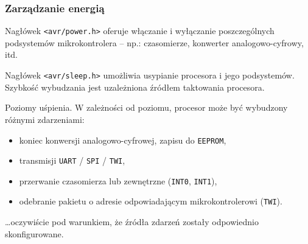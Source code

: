 \documentclass[8pt]{beamer}
\begin{document}
\begin{frame}
  \frametitle{Zarządzanie energią}

  \begin{block}{}
    Nagłówek \texttt{<avr/power.h>} oferuje włączanie i wyłączanie
    poszczególnych podsystemów mikrokontrolera -- np.: czasomierze, konwerter
    analogowo-cyfrowy, itd.
  \end{block}

  \begin{block}{}
    Nagłówek \texttt{<avr/sleep.h>} umożliwia usypianie procesora i jego
    podsystemów. Szybkość wybudzania jest uzależniona źródłem taktowania
    procesora.
  \end{block}

  \begin{exampleblock}{Poziomy uśpienia.}
    W zależności od poziomu, procesor może być wybudzony różnymi zdarzeniami:

    \begin{itemize}
      \item koniec konwersji analogowo-cyfrowej, zapisu do \texttt{EEPROM},
      \item transmisji \texttt{UART} / \texttt{SPI} / \texttt{TWI},
      \item przerwanie czasomierza lub zewnętrzne (\texttt{INT0}, \texttt{INT1}),
      \item odebranie pakietu o adresie odpowiadającym mikrokontrolerowi (\texttt{TWI}).
    \end{itemize}

    \ldots oczywiście pod warunkiem, że źródła zdarzeń zostały odpowiednio
    skonfigurowane.
  \end{exampleblock}
\end{frame}
\end{document}
